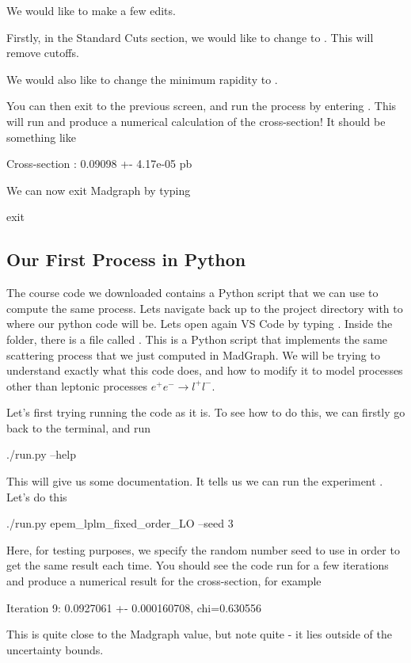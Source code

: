 We would like to make a few edits. 

Firstly, in the Standard Cuts section, we would like to change  to . This will remove cutoffs. 

We would also like to change the minimum rapidity  to .

You can then exit to the previous screen, and run the process by entering . This will run and produce a numerical calculation of the cross-section! It should be something like
\begin{codeenv}
     Cross-section :   0.09098 +- 4.17e-05 pb
\end{codeenv}

We can now exit Madgraph by typing
\begin{codeenv}
    exit
\end{codeenv}

\subsection*{Our First Process in Python}

The course code we downloaded contains a Python script that we can use to compute the same process. Lets navigate back up to the project directory with  to where our python code will be. Lets open again VS Code by typing . Inside the  folder, there is a file called . This is a Python script that implements the same scattering process that we just computed in MadGraph. We will be trying to understand exactly what this code does, and how to modify it to model processes other than leptonic processes $e^+ e^- \to l^+l^-$.

Let's first trying running the code as it is. To see how to do this, we can firstly go back to the terminal, and run
\begin{codeenv}
    ./run.py --help
\end{codeenv}
This will give us some documentation. It tells us we can run the experiment . Let's do this
\begin{codeenv}
    ./run.py epem_lplm_fixed_order_LO --seed 3
\end{codeenv}
Here, for testing purposes, we specify the random number seed to use in order to get the same result each time. You should see the code run for a few iterations and produce a numerical result for the cross-section, for example
\begin{codeenv}
    Iteration 9: 0.0927061 +- 0.000160708, chi=0.630556
\end{codeenv}
This is quite close to the Madgraph value, but note quite - it lies outside of the uncertainty bounds.


